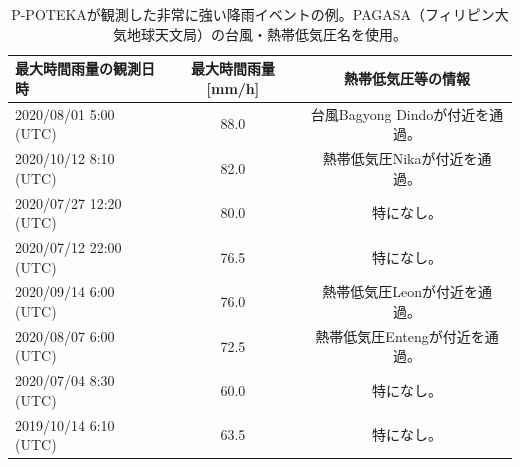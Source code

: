 \begin{table}[h]
\centering
\begin{tabular}{lcc}
\hline
最大時間雨量の観測日時 & 最大時間雨量[mm/h] & 熱帯低気圧等の情報 \\
\hline \hline
2020/08/01 5:00 (UTC) & 88.0 & 台風Bagyong Dindoが付近を通過。 \\
2020/10/12 8:10 (UTC) & 82.0 & 熱帯低気圧Nikaが付近を通過。 \\
2020/07/27 12:20 (UTC) & 80.0 & 特になし。 \\
2020/07/12 22:00 (UTC) & 76.5 & 特になし。 \\
2020/09/14 6:00 (UTC) & 76.0 & 熱帯低気圧Leonが付近を通過。 \\
2020/08/07 6:00 (UTC) & 72.5 & 熱帯低気圧Entengが付近を通過。 \\
2020/07/04 8:30 (UTC) & 60.0 & 特になし。 \\
2019/10/14 6:10 (UTC) & 63.5 & 特になし。 \\
\hline
\end{tabular}
\caption{P-POTEKAが観測した非常に強い降雨イベントの例。PAGASA（フィリピン大気地球天文局）の台風・熱帯低気圧名を使用。}
\label{tb:poteka-heavy-rainfalls}
\end{table}



